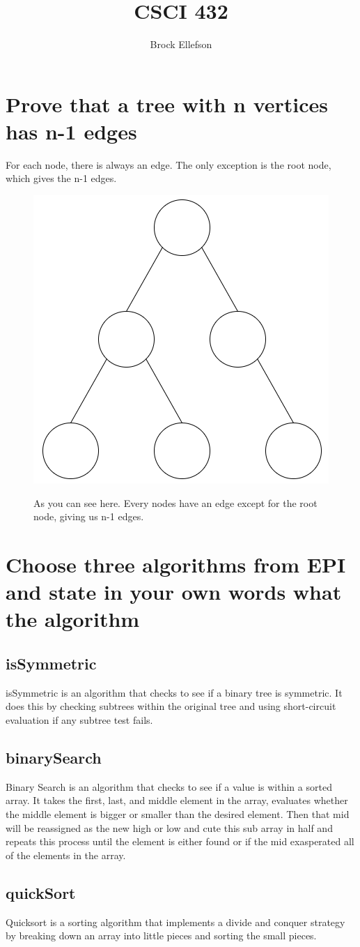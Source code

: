 \documentclass[10pt,letterpaper]{article}
\author{Brock Ellefson}
\title{CSCI 432}
\begin{document}
\maketitle
\section{Prove that a tree with n vertices has n-1 edges}
For each node, there is always an edge. The only exception is the root node, which gives the n-1 edges.
	\begin{figure}[h]
	    \caption{As you can see here. Every nodes have an edge except for the root node, giving us n-1 edges.}
		\includegraphics[scale = .25]{CSCI432HW1TreeExample.png}
  		\label{fig:PCP}
	\end{figure}
\section{Choose three algorithms from EPI and state in your own words what the algorithm}	
	\subsection*{isSymmetric}
		isSymmetric is an algorithm that checks to see if a binary tree is symmetric. It does this by checking subtrees within the original tree and using short-circuit evaluation if any subtree test fails.
	\subsection*{binarySearch} 
		Binary Search is an algorithm that checks to see if a value is within a sorted array. It takes the first, last, and middle element in the array, evaluates whether the middle element is bigger or smaller than the desired element. Then that mid will be reassigned as the new high or low and cute this sub array in half and repeats this process until the element is either found or if the mid exasperated all of the elements in the array.
	\subsection*{quickSort}
		Quicksort is a sorting algorithm that implements a divide and conquer strategy by breaking down an array into little pieces and sorting the small pieces.
		
\end{document}
